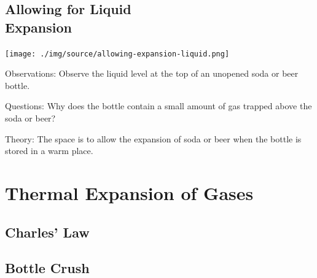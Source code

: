 \begin{multicols}{2}
\subsection[Allowing for Liquid Expansion]{Allowing for Liquid \hfill \\ Expansion}

\begin{center}
\texttt{[image: ./img/source/allowing-expansion-liquid.png]}
\end{center}

\begin{description*}
\item[Observations:]{Observe the liquid level at the top of an unopened soda or beer bottle.}
\item[Questions:]{Why does the bottle contain a small amount of gas trapped above the soda or beer?}
\item[Theory:]{The space is to allow the expansion of soda or beer when the bottle is stored in a warm place.}
\end{description*}


\section*{Thermal Expansion of Gases}

\subsection*{Charles' Law}

\subsection{Bottle Crush}


\end{multicols}
